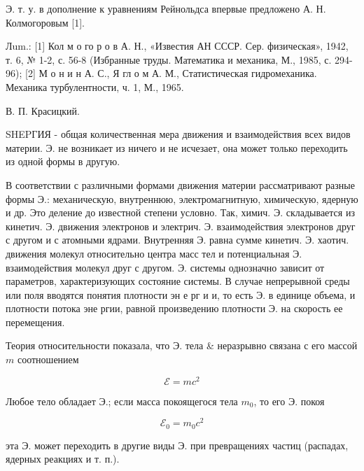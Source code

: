 \documentclass[10pt]{article}
\begin{document}
Э. т. у. в дополнение к уравнениям Рейнольдса впервые предложено А. Н. Колмогоровым [1].



Лum.: [1] Кол м о го р о в А. Н., «Известия АН СССР. Сер. физическая», 1942, т. 6, № 1-2, с. 56-8 (Избранные труды. Математика и механика, М., 1985, с. 294-96); [2] М о н и н А. С., Я гл о м А. М., Статистическая гидромеханика. Механика турбулентности, ч. 1, М., 1965.



В. П. Красицкий.



SHEPГИЯ - общая количественная мера движения и взаимодействия всех видов материи. Э. не возникает из ничего и не исчезает, она может только переходить из одной формы в другую.



В соответствии с различными формами движения материи рассматривают разные формы Э.: механическую, внутреннюю, электромагнитную, химическую, ядерную и др. Это деление до известной степени условно. Так, химич. Э. складывается из кинетич. Э. движения электронов и электрич. Э. взаимодействия электронов друг с другом и с атомными ядрами. Внутренняя Э. равна сумме кинетич. Э. хаотич. движения молекул относительно центра масс тел и потенциальная Э. взаимодействия молекул друг с другом. Э. системы однозначно зависит от параметров, характеризующих состояние системы. В случае непрерывной среды или поля вводятся понятия плотности эн е рг и и, то есть Э. в единице объема, и плотности потока эне ргии, равной произведению плотности Э. на скорость ее перемещения.



Теория относительности показала, что Э. тела \& неразрывно связана с его массой $m$ соотношением



\[

\mathscr{E}=m c^{2}

\]



Любое тело обладает $Э$.; если масса покоящегося тела $m_{0}$, то его Э. покоя



\[

\mathscr{E}_{0}=m_{0} c^{2}

\]



эта Э. может переходить в другие виды Э. при превращениях частиц (распадах, ядерных реакциях и т. п.).
\end{document}
